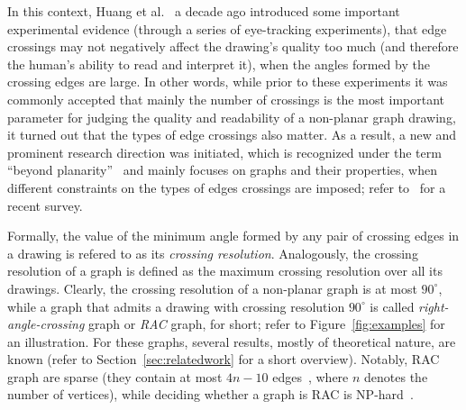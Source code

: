 \documentclass[runningheads]{llncs}
\begin{document}
In this context, Huang et al.~\cite{DBLP:conf/apvis/Huang07,DBLP:journals/vlc/HuangEH14} a decade ago introduced some important experimental evidence (through a series of eye-tracking experiments), that edge crossings may not negatively affect the drawing's quality too much (and therefore the human's ability to read and interpret it), when the angles formed by the crossing edges are large. In other words, while prior to these experiments it was commonly accepted that mainly the number of crossings is the most important parameter for judging the quality and readability of a non-planar graph drawing, it turned out that the types of edge crossings also matter. As a result, a new and prominent research direction was initiated, which is recognized under the term ``beyond planarity''~\cite{Shonan2016,Dagstuhl2016,SoCG2017} and mainly focuses on graphs and their properties, when different constraints on the types of edges crossings are imposed; refer to~\cite{DBLP:journals/corr/abs-1804-07257} for a recent survey. 

Formally, the value of the minimum angle formed by any pair of crossing edges in a drawing is refered to as its \emph{crossing resolution}. Analogously, the crossing resolution of a graph is defined as the maximum crossing resolution over all its drawings. Clearly, the crossing resolution of a non-planar graph is at most $90^\circ$, while a graph that admits a drawing with crossing resolution $90^\circ$ is called \emph{right-angle-crossing} graph or \emph{RAC} graph, for short; refer to Figure~\ref{fig:examples} for an illustration. For these graphs, several results, mostly of theoretical nature, are known (refer to Section~\ref{sec:relatedwork} for a short overview). Notably, RAC graph are sparse (they contain at most $4n-10$ edges~\cite{DBLP:journals/tcs/DidimoEL11}, where $n$ denotes the number of  vertices), while deciding whether a graph is RAC is NP-hard~\cite{DBLP:journals/jgaa/ArgyriouBS12}.
\end{document}
